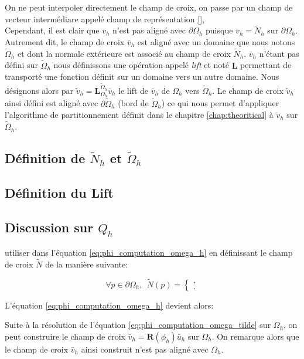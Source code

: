 On ne peut interpoler directement le champ de croix, on passe par un champ de vecteur intermédiare appelé champ de représentation \ref{},\\
\[\]
Cependant, il est clair que $\bar{v}_h$ n'est pas aligné avec $\partial\Omega_h$ puisque $\bar{v}_h=\widetilde{N}_h$ sur $\partial\Omega_h$. Autrement dit, le champ de croix $\bar{v}_h$ est aligné avec un domaine que nous notons $\widetilde{\Omega}_h$ et dont la normale extérieure est associé au champ de croix $\widetilde{N}_h$. $\bar{v}_h$ n'étant pas défini sur $\widetilde{\Omega}_h$ nous définissons une opération appelé \emph{lift} et noté $\mathbf{L}$ permettant de transporté une fonction définit sur un domaine vers un autre domaine. Nous désignons alors par $\widetilde{v}_h=\mathbf{L}_{\Omega_h}^{\widetilde{\Omega}_h}\bar{v}_h$ le lift de $\bar{v}_h$ de $\Omega_h$ vers $\widetilde{\Omega}_h$. Le champ de croix $\widetilde{v}_h$ ainsi défini est aligné avec $\partial\widetilde{\Omega}_h$ (bord de $\widetilde{\Omega}_h$) ce qui nous permet d'appliquer l'algorithme de partitionnement définit dans le chapitre \ref{chap:theoritical} à $\widetilde{v}_h$ sur $\widetilde{\Omega}_h$.

\subsection*{Définition de $\widetilde{N}_h$ et $\widetilde{\Omega}_h$}

\subsection*{Définition du Lift}

\subsection*{Discussion sur $Q_h$}

utiliser dans l'équation \eqref{eq:phi_computation_omega_h} en définissant le champ de croix $\widetilde{N}$ de la manière suivante:

$$
\forall p\in\partial\Omega_h,~~\widetilde{N}(p)=
\left\{
\begin{array}{lcl}
,\\[0.25cm]
.
\end{array}
\right.
$$

L'équation \eqref{eq:phi_computation_omega_h} devient alors:


Suite à la résolution de l'équation \eqref{eq:phi_computation_omega_tilde} sur $\Omega_h$, on peut construire le champ de croix $\bar{v}_h=\mathbf{R}(\phi_h)\bar{u}_h$ sur $\Omega_h$. On remarque alors que le champ de croix $\bar{v}_h$ ainsi construit n'est pas aligné avec $\Omega_h$.

